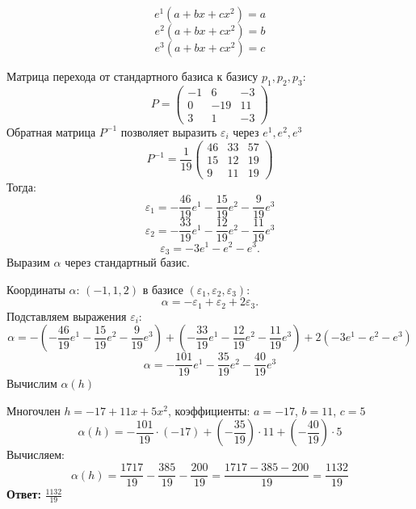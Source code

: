 \documentclass[a4paper]{article}
\begin{document}
\begin{enumerate}
    \[ e^1(a + bx + cx^2) = a \]
    \[ e^2(a + bx + cx^2) = b \]
    \[ e^3(a + bx + cx^2) = c \]

    Матрица перехода от стандартного базиса к базису \( p_1, p_2, p_3 \):
    \[
    P = \begin{pmatrix}
    -1 & 6 & -3 \\
    0 & -19 & 11 \\
    3 & 1 & -3
    \end{pmatrix}
    \]
    Обратная матрица \( P^{-1} \) позволяет выразить \( \varepsilon_i \) 
    через \( e^1, e^2, e^3 \)
    \[
    P^{-1} = \frac{1}{19} \begin{pmatrix}
    46 & 33 & 57 \\
    15 & 12 & 19 \\
    9 & 11 & 19
    \end{pmatrix}
    \]
    Тогда:
    \[
    \varepsilon_1 = -\frac{46}{19}e^1 - \frac{15}{19}e^2 - \frac{9}{19}e^3
    \]
    \[
    \varepsilon_2 = -\frac{33}{19}e^1 - \frac{12}{19}e^2 - \frac{11}{19}e^3
    \]
    \[
    \varepsilon_3 = -3e^1 - e^2 - e^3.
    \]
    Выразим \( \alpha \) через стандартный базис.

    Координаты \( \alpha \): \( (-1, 1, 2) \) в базисе 
    \( (\varepsilon_1, \varepsilon_2, \varepsilon_3) \):
    \[
    \alpha = -\varepsilon_1 + \varepsilon_2 + 2\varepsilon_3.
    \]
    Подставляем выражения \( \varepsilon_i \):
    \[
    \alpha = -\left(-\frac{46}{19}e^1 - \frac{15}{19}e^2 -
     \frac{9}{19}e^3\right) + \left(-\frac{33}{19}e^1 -
      \frac{12}{19}e^2 - \frac{11}{19}e^3\right) + 2\left(-3e^1 - e^2 - e^3\right)
    \]
    \[
    \alpha = -\frac{101}{19}e^1 - \frac{35}{19}e^2 - \frac{40}{19}e^3
    \]
    Вычислим \( \alpha(h) \)

    Многочлен \( h = -17 + 11x + 5x^2 \), коэффициенты: \( a = -17 \), 
    \( b = 11 \), \( c = 5 \)
    \[
    \alpha(h) = -\frac{101}{19} \cdot (-17) + \left(-\frac{35}{19}\right)
     \cdot 11 + \left(-\frac{40}{19}\right) \cdot 5
    \]
    Вычисляем:
    \[
    \alpha(h) = \frac{1717}{19} - \frac{385}{19} - \frac{200}{19} =
     \frac{1717 - 385 - 200}{19} = \frac{1132}{19}
    \]
    \textbf{Ответ: } $\frac{1132}{19}$
        
\end{enumerate}
\end{document}
